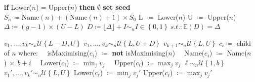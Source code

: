 \begin{algorithm}[hbtp]
\begin{algorithmic}[1]
	\State \textbf{if} Lower($n$) = Upper($n$) \textbf{then} \Return $\emptyset$
    \State \textbf{set seed} $S_n\coloneqq \text{Name}\left(n\right) + \left(\text{Name}\left(n\right) + 1\right) \times S_0$ 
        \State L $\coloneqq$ Lower($n$)
        \State U $\coloneqq$ Upper($n$)
        \State $\Delta \coloneqq \left(g - 1\right) \times \left(U - L\right)$
        \State $D \coloneqq \lfloor\Delta\rfloor + I\sim_n I\in\left\{0,1\right\}~s.t.: \mathbb{E}\left(D\right)=\Delta$

            \State $v_1,\dots,v_k \sim_n\mathcal{U}\left\{L-D, U\right\}$
        \Else
            \State $v_1,\dots,v_k \sim_n\mathcal{U}\left\{L, U+D\right\}$
        \EndIf
        \If{$g > 1$ \textbf{and} $r > X\sim_n\mathcal{U}\left[0,1\right)$}
            \State $v_{k+1} \sim_n\mathcal{U}\left\{L, U\right\}$
        \EndIf
        \State $c_i \coloneqq$ child of $n$ where:
        \State ~~isMaximising($c_i$) $\coloneqq$ \textbf{not} isMaximising($n$) 
        \State ~~Name($c_i$) $\coloneqq$ Name($n$)$~\times~b + i$
        \State ~~Lower($c_i$) $\coloneqq \min_j v_j$
        \State ~~Upper($c_i$) $\coloneqq \max_j v_j$
    \EndFor
    \State $\ell \sim_n \mathcal{U}\left\{1,b\right\}$
    \State $v_1',\dots,v_k' \sim_n \mathcal{U}\left\{L,U\right\}$
    \State Lower($c_\ell$) $\coloneqq \min_j v_j'$
    \State Upper($c_\ell$) $\coloneqq \max_j v_j'$
    \EndIf
\end{algorithmic}
\caption{Expand($n$, $S_0$, $b$, $k$, $g$, $r$) $\to c_1,\dots,c_b$; the children of $n$}
\label{alg:AGT}
\end{algorithm}
